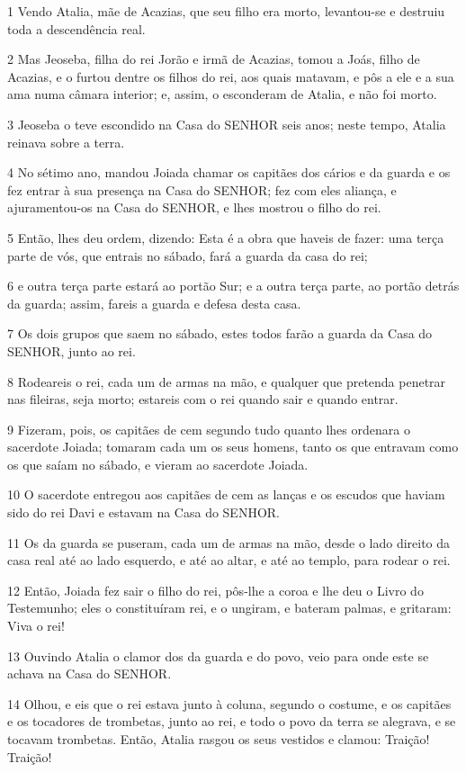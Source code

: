 \par 1 Vendo Atalia, mãe de Acazias, que seu filho era morto, levantou-se e destruiu toda a descendência real.
\par 2 Mas Jeoseba, filha do rei Jorão e irmã de Acazias, tomou a Joás, filho de Acazias, e o furtou dentre os filhos do rei, aos quais matavam, e pôs a ele e a sua ama numa câmara interior; e, assim, o esconderam de Atalia, e não foi morto.
\par 3 Jeoseba o teve escondido na Casa do SENHOR seis anos; neste tempo, Atalia reinava sobre a terra.
\par 4 No sétimo ano, mandou Joiada chamar os capitães dos cários e da guarda e os fez entrar à sua presença na Casa do SENHOR; fez com eles aliança, e ajuramentou-os na Casa do SENHOR, e lhes mostrou o filho do rei.
\par 5 Então, lhes deu ordem, dizendo: Esta é a obra que haveis de fazer: uma terça parte de vós, que entrais no sábado, fará a guarda da casa do rei;
\par 6 e outra terça parte estará ao portão Sur; e a outra terça parte, ao portão detrás da guarda; assim, fareis a guarda e defesa desta casa.
\par 7 Os dois grupos que saem no sábado, estes todos farão a guarda da Casa do SENHOR, junto ao rei.
\par 8 Rodeareis o rei, cada um de armas na mão, e qualquer que pretenda penetrar nas fileiras, seja morto; estareis com o rei quando sair e quando entrar.
\par 9 Fizeram, pois, os capitães de cem segundo tudo quanto lhes ordenara o sacerdote Joiada; tomaram cada um os seus homens, tanto os que entravam como os que saíam no sábado, e vieram ao sacerdote Joiada.
\par 10 O sacerdote entregou aos capitães de cem as lanças e os escudos que haviam sido do rei Davi e estavam na Casa do SENHOR.
\par 11 Os da guarda se puseram, cada um de armas na mão, desde o lado direito da casa real até ao lado esquerdo, e até ao altar, e até ao templo, para rodear o rei.
\par 12 Então, Joiada fez sair o filho do rei, pôs-lhe a coroa e lhe deu o Livro do Testemunho; eles o constituíram rei, e o ungiram, e bateram palmas, e gritaram: Viva o rei!
\par 13 Ouvindo Atalia o clamor dos da guarda e do povo, veio para onde este se achava na Casa do SENHOR.
\par 14 Olhou, e eis que o rei estava junto à coluna, segundo o costume, e os capitães e os tocadores de trombetas, junto ao rei, e todo o povo da terra se alegrava, e se tocavam trombetas. Então, Atalia rasgou os seus vestidos e clamou: Traição! Traição!
